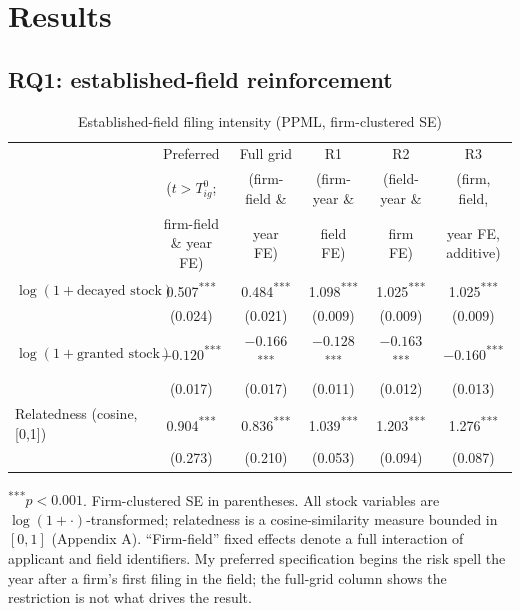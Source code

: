 \documentclass[12pt]{article}
\begin{document}
\section{Results}

\subsection{RQ1: established-field reinforcement}

\begin{table}[htbp]
\centering
\small
\caption{Established-field filing intensity (PPML, firm-clustered SE)}
\label{tab:block1a}
\begin{tabular}{lccccc}
\toprule
 & Preferred & Full grid & R1 & R2 & R3 \\
 & \scriptsize($t>T^0_{ig}$; & \scriptsize(firm-field \& & \scriptsize(firm-year \& & \scriptsize(field-year \& & \scriptsize(firm, field, \\
 & \scriptsize firm-field \& year FE) & \scriptsize year FE) & \scriptsize field FE) & \scriptsize firm FE) & \scriptsize year FE, additive) \\
\midrule
$\log(1+\text{decayed stock})$ & 0.507\textsuperscript{***} & 0.484\textsuperscript{***} & 1.098\textsuperscript{***} & 1.025\textsuperscript{***} & 1.025\textsuperscript{***} \\
 & (0.024) & (0.021) & (0.009) & (0.009) & (0.009) \\
$\log(1+\text{granted stock})$ & $-0.120$\textsuperscript{***} & $-0.166$\textsuperscript{***} & $-0.128$\textsuperscript{***} & $-0.163$\textsuperscript{***} & $-0.160$\textsuperscript{***} \\
 & (0.017) & (0.017) & (0.011) & (0.012) & (0.013) \\
Relatedness (cosine, [0,1]) & 0.904\textsuperscript{***} & 0.836\textsuperscript{***} & 1.039\textsuperscript{***} & 1.203\textsuperscript{***} & 1.276\textsuperscript{***} \\
 & (0.273) & (0.210) & (0.053) & (0.094) & (0.087) \\
\bottomrule
\end{tabular}
\begin{minipage}{\textwidth}
\vspace{2pt}
\footnotesize \textsuperscript{***}$p<0.001$. Firm-clustered SE in parentheses. All stock variables are $\log(1+\cdot)$-transformed; relatedness is a cosine-similarity measure bounded in $[0,1]$ (Appendix A). ``Firm-field'' fixed effects denote a full interaction of applicant and field identifiers. My preferred specification begins the risk spell the year after a firm's first filing in the field; the full-grid column shows the restriction is not what drives the result.
\end{minipage}
\end{table}
\end{document}
